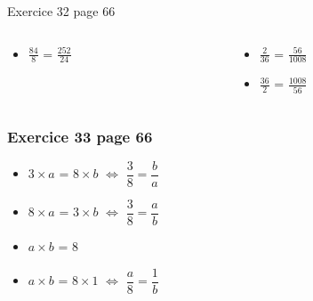 \documentclass[xcolor={dvipsnames}, handout]{beamer}
\begin{document}
\begin{frame}
\begin{block}{Exercice 32 page 66}
\begin{columns}
\begin{column}{0.25\textwidth}
\begin{LARGE}
\begin{itemize}
						\item $\frac{84}{8}$ = $\frac{252}{24}$\pause			
					\end{itemize}	
				\end{LARGE}
				
			\end{column}
			
			\begin{column}{0.25\textwidth}
				\begin{LARGE}
					\begin{itemize}
						\item $\frac{2}{36}$ = $\frac{56}{1008}$					
						
						\item $\frac{36}{2}$ = $\frac{1008}{56}$
					\end{itemize}	
				\end{LARGE}
				
			\end{column}
		\end{columns}
	\end{block}
	
\end{frame}

\begin{frame}
	\frametitle{Exercice 33 page 66}
	
	\begin{LARGE}
		\begin{itemize}
			\setlength\itemsep{1em}
			\item $3 \times a$ = $8 \times b$ $\Leftrightarrow$ $\dfrac{3}{8} = \dfrac{b}{a}$    \pause
			
			\item $8 \times a$ = $3 \times b$ $\Leftrightarrow$ $\dfrac{3}{8} = \dfrac{a}{b}$     \pause
			
			\item<3> $a \times b$ = $8$  \pause
			
			\item<4> $a \times b$ = $8 \times 1$ $\Leftrightarrow$ $\dfrac{a}{8} = \dfrac{1}{b}$     \pause
		\end{itemize}
	\end{LARGE}
	
\end{frame}
\end{document}
